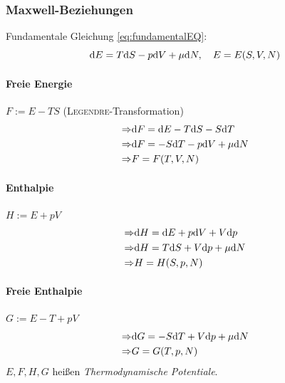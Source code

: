 \subsubsection{Maxwell-Beziehungen}
Fundamentale Gleichung \eqref{eq:fundamentalEQ}:
\begin{equation}
    \mathrm{d} E = T \mathrm{d} S - p \mathrm{d} V + \mu \mathrm{d} N, \quad E=E(S, V, N)
\end{equation}
\paragraph{Freie Energie} $F:=E - TS$ (\textsc{Legendre}-Transformation)
\begin{equation}
    \begin{split}
        \Rightarrow & \mathrm{d} F = \mathrm{d} E - T \mathrm{d} S - S \mathrm{d} T \\
        \Rightarrow & \mathrm{d} F = -S\mathrm{d} T - p \mathrm{d} V + \mu \mathrm{d} N \\
        \Rightarrow & F=F(T, V, N)
    \end{split}
\end{equation}
\paragraph{Enthalpie} $H:=E+pV$
\begin{equation}
    \begin{split}
        \Rightarrow & \mathrm{d} H = \mathrm{d} E + p \mathrm{d} V + V \mathrm{d} p \\
        \Rightarrow & \mathrm{d} H = T \mathrm{d} S + V \mathrm{d} p + \mu \mathrm{d} N \\
        \Rightarrow & H=H(S, p, N)
    \end{split}
\end{equation}
\paragraph{Freie Enthalpie} $G:=E-T+pV$
\begin{equation}
    \begin{split}
        \Rightarrow & \mathrm{d} G = - S \mathrm{d} T + V \mathrm{d} p + \mu \mathrm{d} N \\
        \Rightarrow & G=G(T, p, N)
    \end{split}
\end{equation}
$E, F, H, G$ heißen \emph{Thermodynamische Potentiale}.
